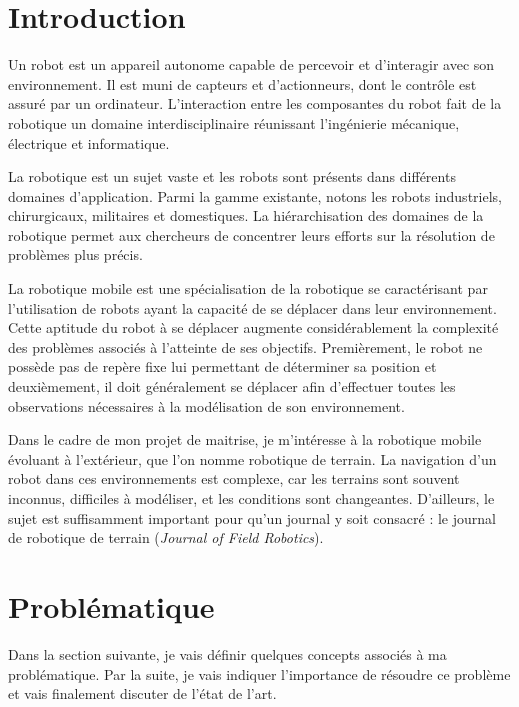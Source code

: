 \documentclass[12pt, letterpaper]{article} %
\begin{document}


\section{Introduction}
Un robot est un appareil autonome capable de percevoir et d'interagir avec son environnement. Il est muni de capteurs et d'actionneurs, dont le contrôle est assuré par un ordinateur. L'interaction entre les composantes du robot fait de la robotique un domaine interdisciplinaire réunissant l'ingénierie mécanique, électrique et informatique.

La robotique est un sujet vaste et les robots sont présents dans différents domaines d'application. Parmi la gamme existante, notons les robots industriels, chirurgicaux, militaires et domestiques. La hiérarchisation des domaines de la robotique permet aux chercheurs de concentrer leurs efforts sur la résolution de problèmes plus précis.   
 
La robotique mobile est une spécialisation de la robotique se caractérisant par l'utilisation de robots ayant la capacité de se déplacer dans leur environnement. Cette aptitude du robot à se déplacer augmente considérablement la complexité des problèmes associés à l'atteinte de ses objectifs. Premièrement, le robot ne possède pas de repère fixe lui permettant de déterminer sa position et deuxièmement, il doit généralement se déplacer afin d'effectuer toutes les observations nécessaires à la modélisation de son environnement. 

Dans le cadre de mon projet de maitrise, je m'intéresse à la robotique mobile évoluant à l'extérieur, que l'on nomme robotique de terrain. La navigation d'un robot dans ces environnements est complexe, car les terrains sont souvent inconnus, difficiles à modéliser, et les conditions sont changeantes. D'ailleurs, le sujet est suffisamment important pour qu'un journal y soit consacré : le journal de robotique de terrain (\textit{Journal of Field Robotics}). 

\section{Problématique}
Dans la section suivante, je vais définir quelques concepts associés à ma problématique. Par la suite, je vais indiquer l'importance de résoudre ce problème et vais finalement discuter de l'état de l'art.
\end{document}
